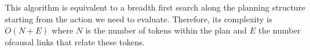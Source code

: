 This algorithm is equivalent to a breadth first search along the
planning structure starting from the action we need to
evaluate. Therefore, its complexity is $O(N+E)$ where $N$ is the
number of tokens within the plan and $E$ the number ofcausal links that relate
these tokens. 

%
%
%
%
